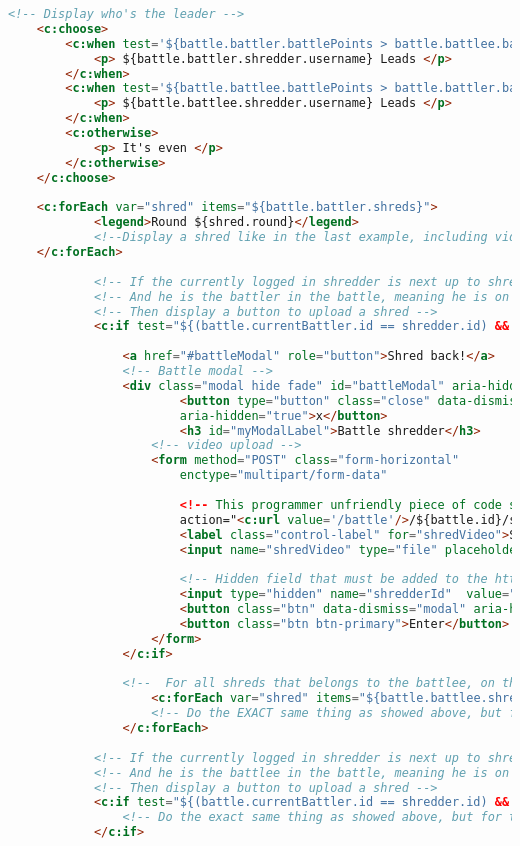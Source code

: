 		  \begin{lstlisting}[language=html]	
	<!-- Display who's the leader -->
	<c:choose>
		<c:when test='${battle.battler.battlePoints > battle.battlee.battlePoints}'>
			<p> ${battle.battler.shredder.username} Leads </p>
		</c:when>
		<c:when test='${battle.battlee.battlePoints > battle.battler.battlePoints}'>
			<p> ${battle.battlee.shredder.username} Leads </p>
		</c:when>								
		<c:otherwise>
			<p> It's even </p>
		</c:otherwise>
	</c:choose>							
	
	<c:forEach var="shred" items="${battle.battler.shreds}">
			<legend>Round ${shred.round}</legend>
			<!--Display a shred like in the last example, including video, rating, comments and shred details -->	
	</c:forEach>
							
			<!-- If the currently logged in shredder is next up to shred, -->
			<!-- And he is the battler in the battle, meaning he is on the left side of the screen --> 
			<!-- Then display a button to upload a shred -->
			<c:if test="${(battle.currentBattler.id == shredder.id) && (battle.battler.shredder.id == shredder.id)}">
					
				<a href="#battleModal" role="button">Shred back!</a>
				<!-- Battle modal -->
				<div class="modal hide fade" id="battleModal" aria-hidden="true">
						<button type="button" class="close" data-dismiss="modal"
						aria-hidden="true">x</button>
						<h3 id="myModalLabel">Battle shredder</h3>
					<!-- video upload -->
					<form method="POST" class="form-horizontal"
						enctype="multipart/form-data"
						
						<!-- This programmer unfriendly piece of code statement builds a url that triggers the controller handler for uploading a shred in a battle -->
						action="<c:url value='/battle'/>/${battle.id}/shred/${battle.currentBattler.id}/fn:length(battle.battler.shreds) + 1}">
						<label class="control-label" for="shredVideo">Shred video</label>
						<input name="shredVideo" type="file" placeholder="Browse" />
						
						<!-- Hidden field that must be added to the http request.. Not easy to spot this one! -->
						<input type="hidden" name="shredderId" 	value="${shredder.id}">
						<button class="btn" data-dismiss="modal" aria-hidden="true">Close</button>
						<button class="btn btn-primary">Enter</button>
					</form>
				</c:if>
	
				<!--  For all shreds that belongs to the battlee, on the right hand side -->
					<c:forEach var="shred" items="${battle.battlee.shreds}">
					<!-- Do the EXACT same thing as showed above, but for the left hand side shredder (battlee)-->
				</c:forEach>
					
			<!-- If the currently logged in shredder is next up to shred, -->
			<!-- And he is the battlee in the battle, meaning he is on the right side of the screen --> 
			<!-- Then display a button to upload a shred -->
			<c:if test="${(battle.currentBattler.id == shredder.id) && (battle.battlee.shredder.id == shredder.id)}">
				<!-- Do the exact same thing as showed above, but for the left hand side shredder (battlee)-->
			</c:if>
		  \end{lstlisting}   
